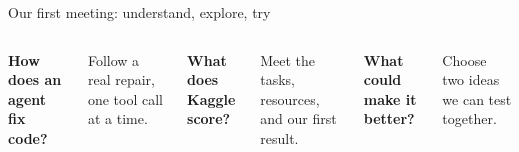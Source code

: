 \titleframe
\logo{}

\begin{frame}{Our first meeting: understand, explore, try}
\begin{columns}[T,onlytextwidth]
\par\vspace{4mm}
\textbf{How does an agent fix code?}\par\vspace{2mm}
\small Follow a real repair, one tool call at a time.
\par\vspace{4mm}
\textbf{What does Kaggle score?}\par\vspace{2mm}
\small Meet the tasks, resources, and our first result.
\par\vspace{4mm}
\textbf{What could make it better?}\par\vspace{2mm}
\small Choose two ideas we can test together.
\end{columns}

\end{frame}
